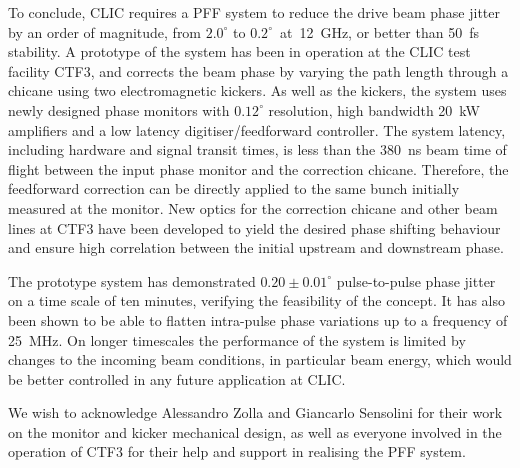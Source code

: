 \documentclass[%
 reprint,
superscriptaddress,
 amsmath,amssymb,
 prl,
]{revtex4-1}
\begin{document}

To conclude, CLIC requires a PFF system to reduce the drive beam phase jitter 
by an order of magnitude, from \(2.0^\circ\) to \(0.2^\circ\)~at~12~GHz, or 
better than 50~fs stability. A prototype of the system has been 
in operation at the CLIC test facility CTF3, and corrects the beam phase by 
varying the path length through a chicane using two electromagnetic kickers. 
As well as the kickers, the system uses newly designed phase monitors with 
\(0.12^\circ\) resolution, high bandwidth 20~kW amplifiers and a low latency 
digitiser/feedforward controller. The system latency, including hardware and 
signal transit times, is less than the 380~ns beam time of flight between the 
input phase monitor and the correction chicane. Therefore, the feedforward 
correction can be directly applied to the same bunch initially measured at the 
monitor. New optics for the correction chicane and other beam lines at CTF3 
have been 
developed to yield the desired phase shifting behaviour and ensure high 
correlation between the initial upstream and downstream phase.

The prototype system has demonstrated \(0.20\pm0.01^\circ\) pulse-to-pulse 
phase jitter on a time scale of ten minutes, verifying the feasibility of the 
concept. It has also been shown to be able 
to flatten intra-pulse phase variations up to a frequency of 25~MHz. On longer 
timescales the performance of the system is limited by changes to the incoming 
beam conditions, in particular beam energy, which would be better controlled in 
any future application at CLIC.



\begin{acknowledgments}
	We wish to acknowledge Alessandro Zolla and Giancarlo Sensolini 
	for their work on the monitor and kicker mechanical design,
	as well as everyone involved in the operation of CTF3 for their 
	help and support in realising the PFF system.
\end{acknowledgments}
\end{document}
